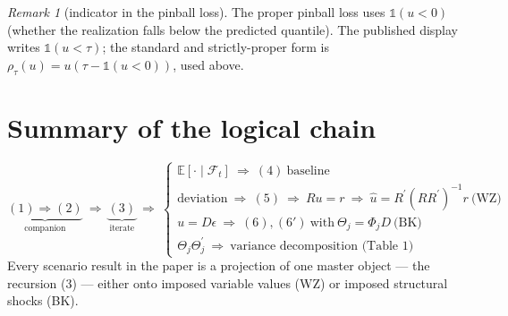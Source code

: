\documentclass[11pt]{article}
\newcommand{\E}{\mathbb{E}}
\newcommand{\Fset}{\mathcal{F}}
\newcommand{\Id}{\mathbb{1}}
\newcommand{\tp}{^{\prime}}
\theoremstyle{remark}
\newtheorem{remark}{Remark}
\begin{document}
\begin{remark}[indicator in the pinball loss]
The proper pinball loss uses $\Id(u<0)$ (whether the realization falls below the
predicted quantile). The published display writes $\Id(u<\tau)$; the standard and
strictly-proper form is $\rho_\tau(u)=u(\tau-\Id(u<0))$, used above.
\end{remark}

\section*{Summary of the logical chain}
\[
\underbrace{(1)\Rightarrow(2)}_{\text{companion}}
\ \Rightarrow\
\underbrace{(3)}_{\text{iterate}}
\ \Rightarrow\
\begin{cases}
\E[\cdot\mid\Fset_t]\ \Rightarrow\ (4)\ \text{baseline}\\[2pt]
\text{deviation}\ \Rightarrow\ (5)\ \Rightarrow\ Ru=r\ \Rightarrow\ \hat u=R\tp(RR\tp)^{-1}r\ \text{(WZ)}\\[2pt]
u=D\epsilon\ \Rightarrow\ (6),(6')\ \text{with}\ \Theta_j=\Phi_jD\ \text{(BK)}\\[2pt]
\Theta_j\Theta_j\tp\ \Rightarrow\ \text{variance decomposition (Table 1)}
\end{cases}
\]
Every scenario result in the paper is a projection of one master object — the
recursion (3) — either onto imposed variable values (WZ) or imposed structural
shocks (BK).
\end{document}
